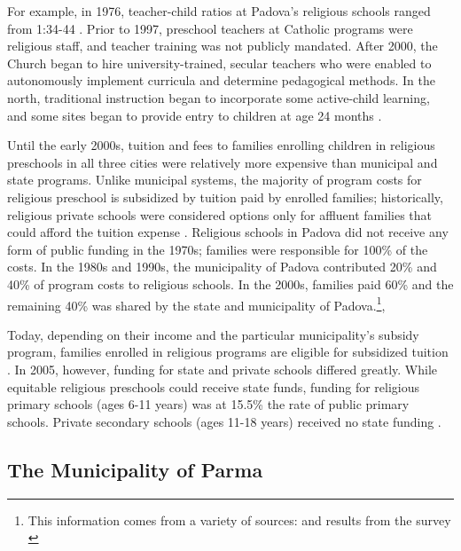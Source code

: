 For example, in 1976, teacher-child ratios at Padova's religious schools ranged from 1:34-44 \citep{Padova-Admin-Data_1964-2011}. Prior to 1997, preschool teachers at Catholic programs were religious staff, and teacher training was not publicly mandated. After 2000, the Church began to hire university-trained, secular teachers who were enabled to autonomously implement curricula and determine pedagogical methods. In the north, traditional instruction began to incorporate some active-child learning, and some sites began to provide entry to children at age 24 months \citep{Hohnerlein_2009_Paradox-Public-Preschools,CEHD_2016_Historical-Analysis}.

Until the early 2000s, tuition and fees to families enrolling children in religious preschools in all three cities were relatively more expensive than municipal and state programs. Unlike municipal systems, the majority of program costs for religious preschool is subsidized by tuition paid by enrolled families; historically, religious private schools were considered options only for affluent families that could afford the tuition expense \citep{Hohnerlein_2009_Paradox-Public-Preschools}. Religious schools in Padova did not receive any form of public funding in the 1970s; families were responsible for 100\% of the costs. In the 1980s and 1990s, the municipality of Padova contributed 20\% and 40\% of program costs to religious schools. In the 2000s, families paid 60\% and the remaining 40\% was shared by the state and municipality of Padova.\footnote{This information comes from a variety of sources: \citet{Reggio-Admin-data_1966-2006, Reggio-Annual-Journals_1994-2011, Padova-Admin-Data_1964-2011} and results from the survey \citep{CEHD_2016_Historical-Analysis}},

Today, depending on their income and the particular municipality's subsidy program, families enrolled in religious programs are eligible for subsidized tuition \citep{Hohnerlein_2009_Paradox-Public-Preschools}. In 2005, however, funding for state and private schools differed greatly. While equitable religious preschools could receive state funds, funding for religious primary schools (ages 6-11 years) was at 15.5\% the rate of public primary schools. Private secondary schools (ages 11-18 years) received no state funding \citep{Becchi-Ferrari_1990_Pub-Inf-Centres-Italy}.

\subsection{The Municipality of Parma}

